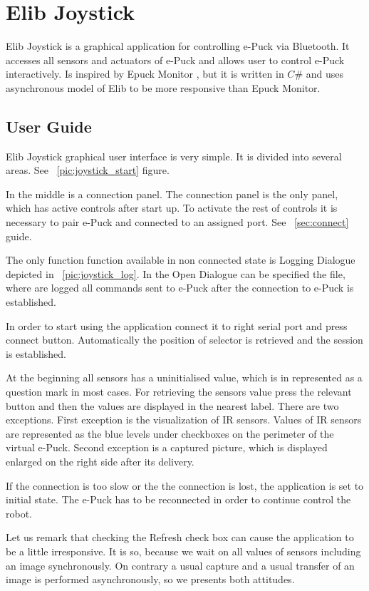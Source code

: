 \chapter{Elib Joystick} \label{app:joystick}
	\label{app:joystick} 
	Elib Joystick is a graphical application for controlling e-Puck via Bluetooth.
	It accesses all sensors and actuators of e-Puck and allows user to control e-Puck interactively.
	Is inspired by Epuck Monitor \cite{monitor}, but it is written in $C\#$ and uses asynchronous model
	of Elib to be more responsive than Epuck Monitor.

	\section{User Guide} \label{sec:joyguide}
	Elib Joystick graphical user interface is very simple. It is divided into several areas.
	See ~\ref{pic:joystick_start} figure.
	

	In the middle is a connection panel. The connection panel is the only panel, which 
	has active controls after start up. To activate the rest of controls it is necessary to
	pair e-Puck and connected to an assigned port. See ~\ref{sec:connect} guide. 
	
	The only function function available in non connected state is Logging Dialogue depicted in ~\ref{pic:joystick_log}.
	In the Open Dialogue can be specified the file, where are logged all commands sent to e-Puck after the connection
	to e-Puck is established.

	In order to start using the application connect it to right serial port and press connect button.
	Automatically the position of selector is retrieved and the session is established.

	At the beginning all sensors has a uninitialised value, which is in represented as a question mark in most cases.
	For retrieving the sensors value press the relevant button and then the values are displayed in the nearest label.
	There are two exceptions. First exception is the visualization of IR sensors. Values of IR sensors
	are represented as the blue levels under checkboxes on 
	the perimeter of the virtual e-Puck.
	Second  exception is a captured picture, which is displayed enlarged on the right side after its delivery.

	If the connection is too slow or the the connection is lost, the application
	is set to initial state. The e-Puck has to be reconnected in order to continue control the robot.

	Let us remark that checking the Refresh check box can cause the application to be a little irresponsive.	
	It is so, because we wait on all values of sensors including an image synchronously.
	On contrary a usual capture and a usual transfer of an image is performed asynchronously, so 
	we presents both attitudes.

